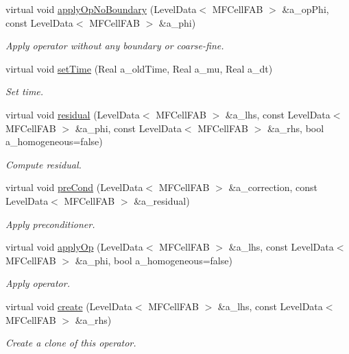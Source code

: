 \begin{DoxyCompactItemize}
virtual void \hyperlink{classnwomfconductivityop_a5a7d697e505ee7466d76f647e3e983a5}{apply\+Op\+No\+Boundary} (Level\+Data$<$ M\+F\+Cell\+F\+AB $>$ \&a\+\_\+op\+Phi, const Level\+Data$<$ M\+F\+Cell\+F\+AB $>$ \&a\+\_\+phi)
\begin{DoxyCompactList}\small\item\em Apply operator without any boundary or coarse-\/fine. \end{DoxyCompactList}\item 
virtual void \hyperlink{classnwomfconductivityop_a98da85128a6c64ed7508313c4b77325b}{set\+Time} (Real a\+\_\+old\+Time, Real a\+\_\+mu, Real a\+\_\+dt)
\begin{DoxyCompactList}\small\item\em Set time. \end{DoxyCompactList}\item 
virtual void \hyperlink{classnwomfconductivityop_a9fcd1570197851fe78ffec6389e19d49}{residual} (Level\+Data$<$ M\+F\+Cell\+F\+AB $>$ \&a\+\_\+lhs, const Level\+Data$<$ M\+F\+Cell\+F\+AB $>$ \&a\+\_\+phi, const Level\+Data$<$ M\+F\+Cell\+F\+AB $>$ \&a\+\_\+rhs, bool a\+\_\+homogeneous=false)
\begin{DoxyCompactList}\small\item\em Compute residual. \end{DoxyCompactList}\item 
virtual void \hyperlink{classnwomfconductivityop_a031574f96d2c9d0a0e06d0deff6540f5}{pre\+Cond} (Level\+Data$<$ M\+F\+Cell\+F\+AB $>$ \&a\+\_\+correction, const Level\+Data$<$ M\+F\+Cell\+F\+AB $>$ \&a\+\_\+residual)
\begin{DoxyCompactList}\small\item\em Apply preconditioner. \end{DoxyCompactList}\item 
virtual void \hyperlink{classnwomfconductivityop_a8683634cfe73ceb92d9811733a75fd08}{apply\+Op} (Level\+Data$<$ M\+F\+Cell\+F\+AB $>$ \&a\+\_\+lhs, const Level\+Data$<$ M\+F\+Cell\+F\+AB $>$ \&a\+\_\+phi, bool a\+\_\+homogeneous=false)
\begin{DoxyCompactList}\small\item\em Apply operator. \end{DoxyCompactList}\item 
virtual void \hyperlink{classnwomfconductivityop_a0d3f616e163de466e2a6b394b4d83b1d}{create} (Level\+Data$<$ M\+F\+Cell\+F\+AB $>$ \&a\+\_\+lhs, const Level\+Data$<$ M\+F\+Cell\+F\+AB $>$ \&a\+\_\+rhs)
\begin{DoxyCompactList}\small\item\em Create a clone of this operator. \end{DoxyCompactList}\item 

\end{DoxyCompactItemize}
